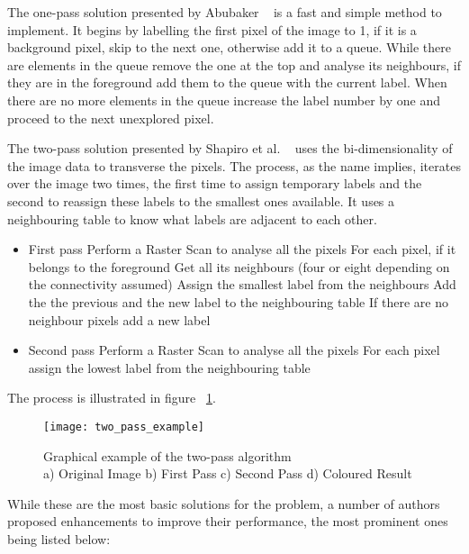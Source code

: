 The one-pass solution presented by Abubaker ~\cite{abubaker_one_2007} is a fast and simple method to implement. It begins by labelling the first pixel of the image to 1, if it is a background pixel, skip to the next one, otherwise add it to a queue. While there are elements in the queue remove the one at the top and analyse its neighbours, if they are in the foreground add them to the queue with the current label. When there are no more elements in the queue increase the label number by one and proceed to the next unexplored pixel.

The two-pass solution presented by Shapiro et al. ~\cite{shapiro_computer_2001} uses the bi-dimensionality of the image data to transverse the pixels. The process, as the name implies, iterates over the image two times, the first time to assign temporary labels and the second to reassign these labels to the smallest ones available. It uses a neighbouring table to know what labels are adjacent to each other.

\begin{itemize}
	\item First pass
		\subitem Perform a Raster Scan to analyse all the pixels
		\subitem For each pixel, if it belongs to the foreground
			\subsubitem Get all its neighbours (four or eight depending on the connectivity assumed)
				\subsubitem Assign the smallest label from the neighbours
				\subsubitem Add the the previous and the new label to the neighbouring table
			\subsubitem If there are no neighbour pixels add a new label
	\item Second pass
		\subitem Perform a Raster Scan to analyse all the pixels
		\subitem For each pixel assign the lowest label from the neighbouring table
\end{itemize}

The process is illustrated in figure ~\ref{fig:two_pass_example}.


\begin{figure}[h]
  \begin{center}
    \leavevmode
    \texttt{[image: two\_pass\_example]}
    \captionsetup{justification=centering}
    \caption{Graphical example of the two-pass algorithm ~\cite{wikipedia_connected_2017}\\a) Original Image b) First Pass c) Second Pass d) Coloured Result}
    \label{fig:two_pass_example}
  \end{center}
\end{figure}

While these are the most basic solutions for the problem, a number of authors proposed enhancements to improve their performance, the most prominent ones being listed below:

